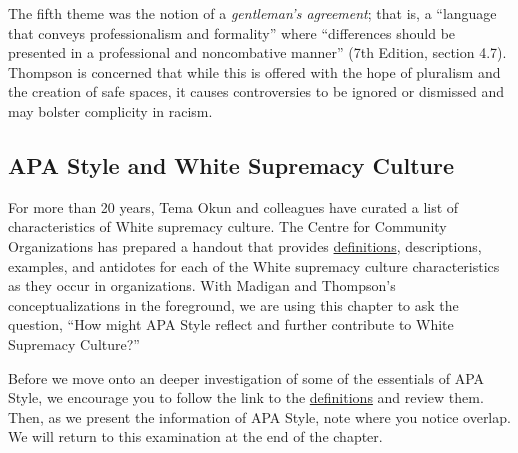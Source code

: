 \documentclass[
  11pt,
]{book}
\begin{document}
The fifth theme was the notion of a \emph{gentleman's agreement}; that is, a ``language that conveys professionalism and formality'' where ``differences should be presented in a professional and noncombative manner'' (7th Edition, section 4.7). Thompson \citeyearpar{thompson_gentlemanly_2004} is concerned that while this is offered with the hope of pluralism and the creation of safe spaces, it causes controversies to be ignored or dismissed and may bolster complicity in racism.

\subsection{APA Style and White Supremacy Culture}\label{apa-style-and-white-supremacy-culture}

For more than 20 years, Tema Okun \citep{noauthor_white_nodate, okun_white_2021} and colleagues have curated a list of characteristics of White supremacy culture. The Centre for Community Organizations has prepared a handout that provides \href{https://coco-net.org/wp-content/uploads/2019/11/Coco-WhiteSupCulture-ENG4.pdf}{definitions}, descriptions, examples, and antidotes for each of the White supremacy culture characteristics as they occur in organizations. With Madigan \citeyearpar{madigan_language_1995} and Thompson's \citeyearpar{thompson_gentlemanly_2004} conceptualizations in the foreground, we are using this chapter to ask the question, ``How might APA Style reflect and further contribute to White Supremacy Culture?''

Before we move onto an deeper investigation of some of the essentials of APA Style, we encourage you to follow the link to the \href{https://coco-net.org/wp-content/uploads/2019/11/Coco-WhiteSupCulture-ENG4.pdf}{definitions} and review them. Then, as we present the information of APA Style, note where you notice overlap. We will return to this examination at the end of the chapter.
\end{document}
